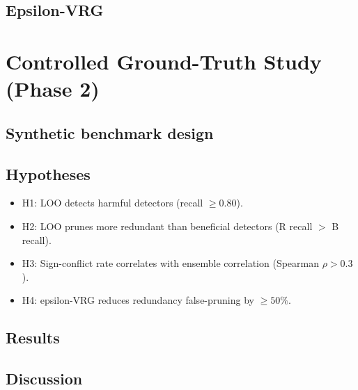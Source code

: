 \documentclass[preprint,12pt]{elsarticle}
\begin{document}
\subsection{Epsilon-VRG}

\section{Controlled Ground-Truth Study (Phase 2)}
\label{sec:phase2}

\subsection{Synthetic benchmark design}

\subsection{Hypotheses}

\begin{itemize}
\item H1: LOO detects harmful detectors (recall $\geq 0.80$).
\item H2: LOO prunes more redundant than beneficial detectors (R recall $>$ B recall).
\item H3: Sign-conflict rate correlates with ensemble correlation (Spearman $\rho > 0.3$).
\item H4: epsilon-VRG reduces redundancy false-pruning by $\geq 50\%$.
\end{itemize}

\subsection{Results}

\subsection{Discussion}
\end{document}

